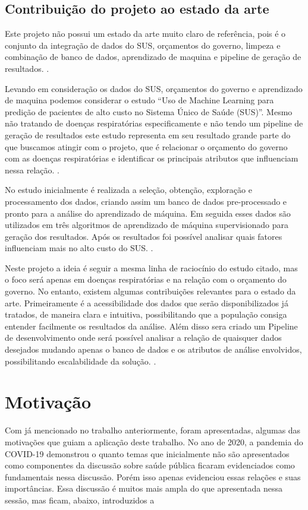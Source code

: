 \documentclass[journal]{IEEEtran}
\begin{document}
\subsection{Contribuição do projeto ao estado da arte}
Este projeto não possui um estado da arte muito claro de referência, pois é o conjunto da integração de dados do SUS, orçamentos do governo, limpeza e combinação de banco de dados, aprendizado de maquina e pipeline de geração de resultados. \cite{estado_arte}.

Levando em consideração os dados do SUS, orçamentos do governo e aprendizado de maquina podemos considerar o estudo ``Uso de Machine Learning para predição de pacientes de alto custo no Sistema Único de Saúde (SUS)''. Mesmo não tratando de doenças respiratórias especificamente e não tendo um pipeline de geração de resultados este estudo representa em seu resultado grande parte do que buscamos atingir com o projeto, que é relacionar o orçamento do governo com as doenças respiratórias e identificar os principais atributos que influenciam nessa relação. \cite{estado_arte}.

No estudo inicialmente é realizada a seleção, obtenção, exploração e processamento dos dados, criando assim um banco de dados pre-processado e pronto para a análise do aprendizado de máquina. Em seguida esses dados são utilizados em três algoritmos de aprendizado de máquina supervisionado para geração dos resultados. Após os resultados foi possível analisar quais fatores influenciam mais no alto custo do SUS.   \cite{estado_arte}.

Neste projeto a ideia é seguir a mesma linha de raciocínio do estudo citado, mas o foco será apenas em doenças respiratórias e na relação com o orçamento do governo. No entanto, existem algumas contribuições relevantes para o estado da arte. Primeiramente é a acessibilidade dos dados que serão disponibilizados já tratados, de maneira clara e intuitiva, possibilitando que a população consiga entender facilmente os resultados da análise. Além disso sera criado um Pipeline de desenvolvimento onde será possível analisar a relação de quaisquer dados desejados mudando apenas o banco de dados e os atributos de análise envolvidos, possibilitando escalabilidade da solução.  \cite{estado_arte}.

\section{Motivação} 
Com já mencionado no trabalho anteriormente, foram apresentadas, algumas das motivações que guiam a aplicação deste trabalho. 
No ano de 2020, a pandemia do COVID-19 demonstrou o quanto temas que inicialmente não são apresentados como componentes da discussão sobre saúde pública ficaram evidenciados como fundamentais nessa discussão. Porém isso apenas evidenciou essas relações e suas importâncias. Essa discussão é muitos mais ampla do que apresentada nessa sessão, mas ficam, abaixo, introduzidos a
\end{document}
